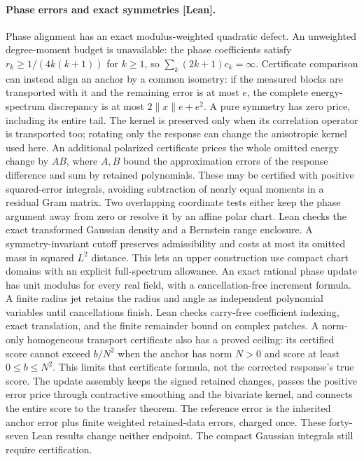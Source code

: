 \documentclass[11pt,a4paper]{article}
\begin{document}
\paragraph{Phase errors and exact symmetries [Lean].}
Phase alignment has an exact modulus-weighted quadratic defect. An unweighted
degree-moment budget is unavailable: the phase coefficients satisfy
$r_k\ge1/(4k(k+1))$ for $k\ge1$, so $\sum_k(2k+1)c_k=\infty$.
Certificate comparison can instead align an anchor by a common isometry:
if the measured blocks are transported with it and the remaining error is at
most $e$, the complete energy-spectrum discrepancy is at most
$2\|x\|e+e^2$. A pure symmetry has zero price, including its entire tail.
The kernel is preserved only when its correlation operator is transported
too; rotating only the response can change the anisotropic kernel used here.
An additional polarized certificate prices the whole omitted energy change
by $AB$, where $A,B$ bound the approximation errors of the response difference
and sum by retained polynomials. These may be certified with positive
squared-error integrals, avoiding subtraction of nearly equal moments in a
residual Gram matrix. Two overlapping coordinate tests either keep the phase
argument away from zero or resolve it by an affine polar chart. Lean checks
the exact transformed Gaussian density and a Bernstein range enclosure.
A symmetry-invariant cutoff preserves admissibility and costs at most its
omitted mass in squared $L^2$ distance. This lets an upper construction use
compact chart domains with an explicit full-spectrum allowance.
An exact rational phase update has unit modulus for every real field, with
a cancellation-free increment formula. A finite radius jet retains the radius
and angle as independent polynomial variables until cancellations finish.
Lean checks carry-free coefficient indexing, exact translation, and the
finite remainder bound on complex patches. A norm-only homogeneous transport
certificate also has a proved ceiling: its certified score cannot exceed
$b/N^2$ when the anchor has norm $N>0$ and score at least $0\le b\le N^2$.
This limits that certificate formula, not the corrected response's true score.
The update assembly keeps the signed retained changes, passes the positive
error price through contractive smoothing and the bivariate kernel, and
connects the entire score to the transfer theorem. The reference error is
the inherited anchor error plus finite weighted retained-data errors,
charged once. These forty-seven Lean results change neither endpoint.
The compact Gaussian integrals still require certification.
\end{document}

